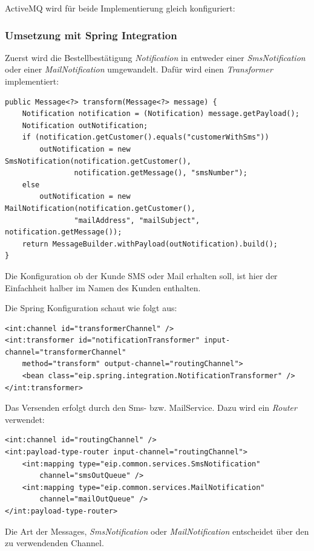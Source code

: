\documentclass[12pt,a4paper,ngerman]{article}
\begin{document}
ActiveMQ wird für beide Implementierung gleich konfiguriert:

\subsubsection{Umsetzung mit Spring Integration}

Zuerst wird die Bestellbestätigung \emph{Notification} in entweder einer
\emph{SmsNotification} oder einer \emph{MailNotification} umgewandelt.
Dafür wird einen \emph{Transformer} implementiert:

\begin{lstlisting}
public Message<?> transform(Message<?> message) {
    Notification notification = (Notification) message.getPayload();
    Notification outNotification;
    if (notification.getCustomer().equals("customerWithSms"))
        outNotification = new SmsNotification(notification.getCustomer(),
                notification.getMessage(), "smsNumber");
    else
        outNotification = new MailNotification(notification.getCustomer(),
                "mailAddress", "mailSubject", notification.getMessage());
    return MessageBuilder.withPayload(outNotification).build();
}
\end{lstlisting}

Die Konfiguration ob der Kunde SMS oder Mail erhalten soll, ist hier der
Einfachheit halber im Namen des Kunden enthalten.

Die Spring Konfiguration schaut wie folgt aus:

\begin{lstlisting}
<int:channel id="transformerChannel" />
<int:transformer id="notificationTransformer" input-channel="transformerChannel"
    method="transform" output-channel="routingChannel">
    <bean class="eip.spring.integration.NotificationTransformer" />
</int:transformer>
\end{lstlisting}

Das Versenden erfolgt durch den Sms- bzw. MailService. Dazu wird ein
\emph{Router} verwendet:

\begin{lstlisting}
<int:channel id="routingChannel" />
<int:payload-type-router input-channel="routingChannel">
    <int:mapping type="eip.common.services.SmsNotification"
        channel="smsOutQueue" />
    <int:mapping type="eip.common.services.MailNotification"
        channel="mailOutQueue" />
</int:payload-type-router>
\end{lstlisting}

Die Art der Messages, \emph{SmsNotification} oder
\emph{MailNotification} entscheidet über den zu verwendenden Channel.
\end{document}
